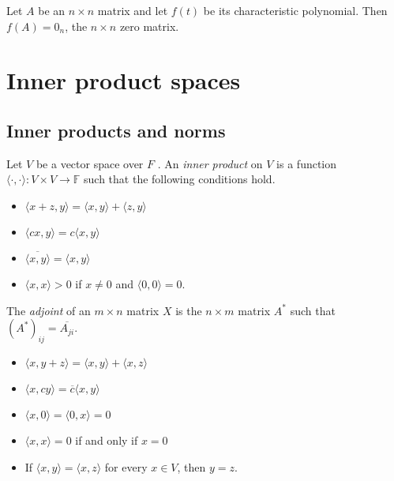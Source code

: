 \documentclass[12pt]{article}
\newenvironment{theorem}[2][Theorem]{\begin{trivlist}
\item[\hskip \labelsep {\bfseries #1}\hskip \labelsep {\bfseries #2.}]}{\end{trivlist}}
\newenvironment{corollary}[2][Corollary]{\begin{trivlist}
\item[\hskip \labelsep {\bfseries #1}\hskip \labelsep {\bfseries #2}]}{\end{trivlist}}
\newenvironment{definition}[2][Definition]{\begin{trivlist}
\item[\hskip \labelsep {\bfseries #1}\hskip \labelsep {\bfseries #2}]}{\end{trivlist}}
\begin{document}
\begin{corollary}{15}
Let $A$ be an $n \times n$ matrix and let $f(t)$ be its characteristic polynomial. Then $f(A) = 0_n$, the $n \times n$ zero matrix.
\end{corollary}

\section{Inner product spaces}

\subsection{Inner products and norms}

\begin{definition}{1}
Let $V$ be a vector space over $F$ . An \textit{inner product} on $V$ is a function $\langle \cdot, \cdot \rangle : V \times V \to \mathbb{F}$ such that the following conditions hold. 
\begin{itemize}
    \item $\langle x + z, y \rangle = \langle x, y \rangle + \langle z,y \rangle$
    
    \item $\langle cx, y \rangle = c\langle x, y \rangle$
    
    \item $\overline{\langle x, y \rangle} = \langle x, y \rangle$
    
    \item $\langle x, x \rangle > 0$ if $x \neq 0$ and $\langle 0, 0 \rangle = 0$.
\end{itemize}
\end{definition}

\begin{definition}{2}
The \textit{adjoint} of an $m \times n$ matrix $X$ is the $n \times m$ matrix $A^*$ such that $(A^*)_{ij} = \overline{A_{ji}}$.
\end{definition}

\begin{theorem}{6.1} \text{ }
\begin{itemize}
    \item $\langle x, y + z \rangle = \langle x, y \rangle + \langle x, z \rangle$
    
    \item $\langle x, cy \rangle = \overline{c}\langle x, y \rangle$
    
    \item $\langle x, 0 \rangle = \langle 0, x \rangle = 0$
    
    \item $\langle x, x \rangle = 0$ if and only if $x = 0$
    
    \item If $\langle x, y \rangle = \langle x, z \rangle$ for every $x \in V$, then $y = z$.
\end{itemize}
\end{theorem}
\end{document}
